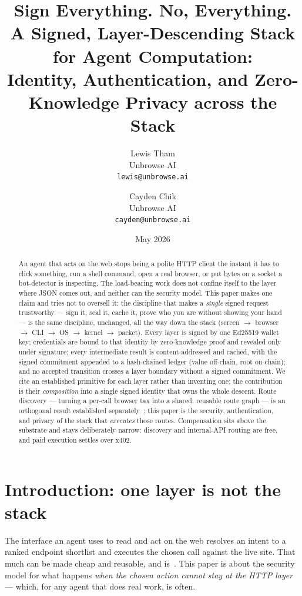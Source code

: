 \documentclass[11pt]{article}
\title{\textbf{Sign Everything. No, Everything.}\\
\large A Signed, Layer-Descending Stack for Agent Computation:\\
Identity, Authentication, and Zero-Knowledge Privacy across the Stack}
\author{Lewis Tham\\ Unbrowse AI \\ \texttt{lewis@unbrowse.ai}
  \and Cayden Chik\\ Unbrowse AI \\ \texttt{cayden@unbrowse.ai}}
\date{May 2026}
\begin{document}
\maketitle

\begin{abstract}
An agent that acts on the web stops being a polite HTTP client the instant it has
to click something, run a shell command, open a real browser, or put bytes on a
socket a bot-detector is inspecting. The load-bearing work does not confine itself
to the layer where JSON comes out, and neither can the security model. This paper
makes one claim and tries not to oversell it: the discipline that makes a
\emph{single} signed request trustworthy --- sign it, seal it, cache it, prove who
you are without showing your hand --- is the same discipline, unchanged, all the
way down the stack (screen $\to$ browser $\to$ CLI $\to$ OS $\to$ kernel $\to$
packet). Every layer is signed by one Ed25519 wallet key;
credentials are bound to that identity by zero-knowledge proof and revealed only
under signature; every intermediate result is content-addressed and cached, with
the signed commitment appended to a hash-chained ledger (value off-chain, root
on-chain); and no accepted transition crosses a layer boundary without a signed
commitment. We cite an established primitive for each layer rather than inventing
one; the contribution is their
\emph{composition} into a single signed identity that owns the whole descent. Route
discovery --- turning a per-call browser tax into a shared, reusable route graph
--- is an orthogonal result established separately~\cite{wedge}; this paper is the
security, authentication, and privacy of the stack that \emph{executes} those
routes. Compensation sits above the substrate and stays deliberately narrow:
discovery and internal-API routing are free, and paid execution settles over x402.
\end{abstract}

\section{Introduction: one layer is not the stack}

The interface an agent uses to read and act on the web resolves an intent to a
ranked endpoint shortlist and executes the chosen call against the live site. That
much can be made cheap and reusable, and is~\cite{wedge}. This paper is about the
security model for what happens \emph{when the chosen action cannot stay at the HTTP
layer} --- which, for any agent that does real work, is often.
\end{document}
